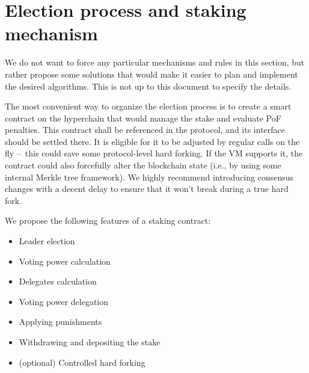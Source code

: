 \section{Election process and staking mechanism}

We do not want to force any particular mechanisms and rules in this section, but
rather propose some solutions that would make it easier to plan and implement
the desired algorithms. This is not up to this document to specify the details.

The most convenient way to organize the election process is to create a smart
contract on the hyperchain that would manage the stake and evaluate PoF
penalties. This contract shall be referenced in the protocol, and its interface
should be settled there. It is eligible for it to be adjusted by regular calls on the fly
– this could save some protocol-level hard forking. If the VM supports it, the
contract could also forcefully alter the blockchain state (i.e., by using some
internal Merkle tree framework). We highly recommend introducing consensus
changes with a decent delay to ensure that it won't break during a true hard fork.

We propose the following features of a staking contract:
\begin{itemize}
\item Leader election
\item Voting power calculation
\item Delegates calculation
\item Voting power delegation
\item Applying punishments
\item Withdrawing and depositing the stake
\item (optional) Controlled hard forking
\end{itemize}
